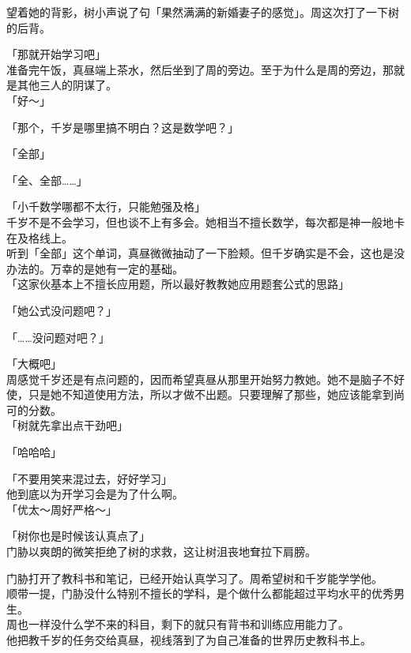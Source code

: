 望着她的背影，树小声说了句「果然满满的新婚妻子的感觉」。周这次打了一下树的后背。\\

\vspace{2\baselineskip}

「那就开始学习吧」\\

准备完午饭，真昼端上茶水，然后坐到了周的旁边。至于为什么是周的旁边，那就是其他三人的阴谋了。\\

「好～」

「那个，千岁是哪里搞不明白？这是数学吧？」

「全部」

「全、全部……」

「小千数学哪都不太行，只能勉强及格」\\

千岁不是不会学习，但也谈不上有多会。她相当不擅长数学，每次都是神一般地卡在及格线上。\\

听到「全部」这个单词，真昼微微抽动了一下脸颊。但千岁确实是不会，这也是没办法的。万幸的是她有一定的基础。\\

「这家伙基本上不擅长应用题，所以最好教教她应用题套公式的思路」

「她公式没问题吧？」

「……没问题对吧？」

「大概吧」\\

周感觉千岁还是有点问题的，因而希望真昼从那里开始努力教她。她不是脑子不好使，只是她不知道使用方法，所以才做不出题。只要理解了那些，她应该能拿到尚可的分数。\\

「树就先拿出点干劲吧」

「哈哈哈」

「不要用笑来混过去，好好学习」\\

他到底以为开学习会是为了什么啊。\\

「优太～周好严格～」

「树你也是时候该认真点了」\\

门胁以爽朗的微笑拒绝了树的求救，这让树沮丧地耷拉下肩膀。

门胁打开了教科书和笔记，已经开始认真学习了。周希望树和千岁能学学他。\\

顺带一提，门胁没什么特别不擅长的学科，是个做什么都能超过平均水平的优秀男生。\\

周也一样没什么学不来的科目，剩下的就只有背书和训练应用能力了。\\

他把教千岁的任务交给真昼，视线落到了为自己准备的世界历史教科书上。
